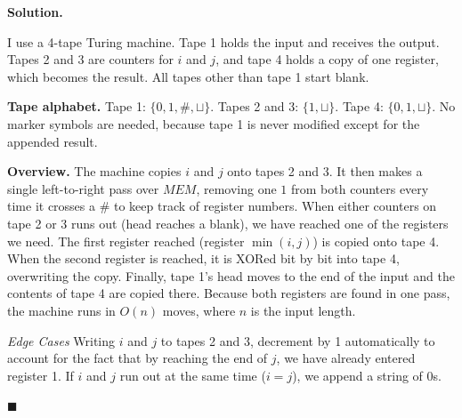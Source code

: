 \documentclass[11pt]{article}
\newenvironment{solution}{%
  \par\noindent\textbf{Solution.}\ \normalfont
}{\hfill$\blacksquare$\par\medskip}
\theoremstyle{plain}
\theoremstyle{definition}
\newcommand{\blank}{\sqcup}                    %
\begin{document}
\begin{solution}
I use a 4-tape Turing machine. Tape 1 holds the input and receives the output. Tapes 2 and 3 are counters for $i$ and $j$, and tape 4 holds a copy of one register, which becomes the result. All tapes other than tape 1 start blank.

\textbf{Tape alphabet.} Tape 1: $\{0, 1, \#, \blank\}$. Tapes 2 and 3: $\{1, \blank\}$. Tape 4: $\{0, 1, \blank\}$. No marker symbols are needed, because tape 1 is never modified except for the appended result.

\textbf{Overview.}
The machine copies $i$ and $j$ onto tapes 2 and 3. It then makes a single left-to-right pass over $\mathit{MEM}$, removing one $1$ from both counters every time it crosses a $\#$ to keep track of register numbers. When either counters on tape 2 or 3 runs out (head reaches a blank), we have reached one of the registers we need. The first register reached (register $\min(i,j)$) is copied onto tape 4. When the second register is reached, it is XORed bit by bit into tape 4, overwriting the copy. Finally, tape 1's head moves to the end of the input and the contents of tape 4 are copied there. Because both registers are found in one pass, the machine runs in $O(n)$ moves, where $n$ is the input length.

\emph{Edge Cases} Writing $i$ and $j$ to tapes 2 and 3, decrement by 1 automatically to account for the fact that by reaching the end of $j$, we have already entered register 1. If $i$ and $j$ run out at the same time ($i = j$), we append a string of $0$s.


\end{solution}
\end{document}
